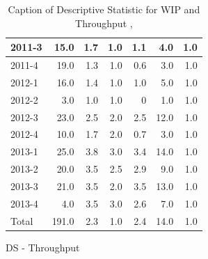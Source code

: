 \documentclass[UKenglish]{ifimaster}  %
\begin{document}
\begin{appendices}
\begin{table}[!htbp]
\begin{adjustwidth}{-2.5cm}{}
\begin{subfigure}[b]{0.3\textwidth}
{\begin{tabular}{ | l | r | r | r | r | r | r | }
2011-3 & 15.0 & 1.7 & 1.0 & 1.1 & 4.0 & 1.0\\ \hline
2011-4 & 19.0 & 1.3 & 1.0 & 0.6 & 3.0 & 1.0\\ \hline
2012-1 & 16.0 & 1.4 & 1.0 & 1.0 & 5.0 & 1.0\\ \hline
2012-2 & 3.0 & 1.0 & 1.0 & 0 & 1.0 & 1.0\\ \hline
2012-3 & 23.0 & 2.5 & 2.0 & 2.5 & 12.0 & 1.0\\ \hline
2012-4 & 10.0 & 1.7 & 2.0 & 0.7 & 3.0 & 1.0\\ \hline
2013-1 & 25.0 & 3.8 & 3.0 & 3.4 & 14.0 & 1.0\\ \hline
2013-2 & 20.0 & 3.5 & 2.5 & 2.9 & 9.0 & 1.0\\ \hline
2013-3 & 21.0 & 3.5 & 2.0 & 3.5 & 13.0 & 1.0\\ \hline
2013-4 & 4.0 & 3.5 & 3.0 & 2.6 & 7.0 & 1.0\\ \hline
Total & 191.0 & 2.3 & 1.0 & 2.4 & 14.0 & 1.0\\ \hline
\end{tabular}
}
\caption{DS - Throughput}
 \label{DS:Throughput:8}
\end{subfigure}
\end{adjustwidth}
\caption[Optional caption for list of figures]{Caption of Descriptive Statistic for WIP and Throughput  , }
\label{DS:8:1}
\end{table}


\end{appendices}
\end{document}
